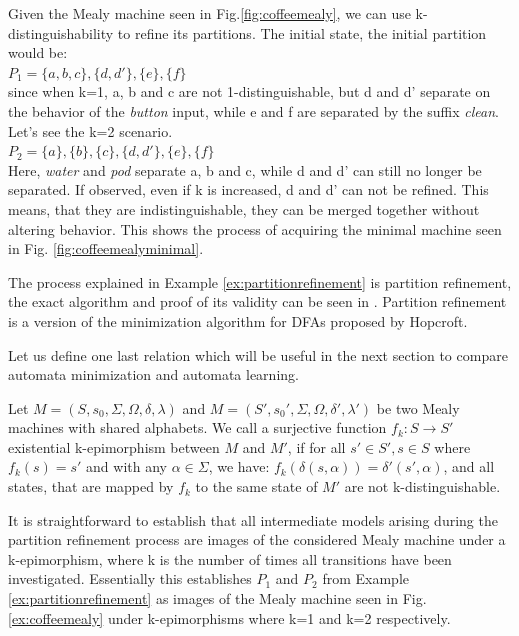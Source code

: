 \begin{example}
	Given the Mealy machine seen in Fig.\ref{fig:coffeemealy}, we can use k-distinguishability to refine its partitions. The initial state, the initial partition would be:\\
	$P_1 = \{a, b, c\}, \{d, d'\}, \{e\}, \{f\}$\\
	since when k=1, a, b and c are not 1-distinguishable, but d and d' separate on the behavior of the \textit{button} input, while e and f are separated by the suffix \textit{clean}. Let's see the k=2 scenario.\\
	$P_2 = \{a\}, \{b\}, \{c\}, \{d, d'\}, \{e\}, \{f\}$\\
	Here, \textit{water} and \textit{pod} separate a, b and c, while d and d' can still no longer be separated. If observed, even if k is increased, d and d' can not be refined. This means, that they are indistinguishable, they can be merged together without altering behavior. This shows the process of acquiring the minimal machine seen in Fig. \ref{fig:coffeemealyminimal}.
	\label{ex:partitionrefinement}
\end{example} 

The process explained in Example \ref{ex:partitionrefinement} is partition refinement, the exact algorithm and proof of its validity can be seen in \cite{Steffen2011}. Partition refinement is a version of the minimization algorithm for DFAs proposed by Hopcroft\cite{HOPCROFT1971189}. 

Let us define one last relation which will be useful in the next section to compare automata minimization and automata learning.

\begin{definition}[k-epimorphisms]
	Let $M=(S,s_{0},\Sigma,\Omega,\delta,\lambda)$ and $M=(S',s_{0}',\Sigma,\Omega,\delta',\lambda')$ be two Mealy machines with shared alphabets. We call a surjective function $f_k: S \to S'$ existential k-epimorphism between $M$ and $M'$, if for all $s'\in S', s\in S$ where $f_k(s) = s'$ and with any $\alpha\in\Sigma$, we have: $f_k(\delta(s,\alpha)) = \delta'(s',\alpha)$, and all states, that are mapped by $f_k$ to the same state of $M'$ are not k-distinguishable.
\end{definition}

 It is straightforward to establish that all intermediate models arising during the partition refinement process are images of the considered Mealy machine under a k-epimorphism, where k is the number of times all transitions have been investigated.\cite{Steffen2011} Essentially this establishes $P_1$ and $P_2$ from Example \ref*{ex:partitionrefinement} as images of the Mealy machine seen in Fig. \ref{ex:coffeemealy} under k-epimorphisms where k=1 and k=2 respectively.

